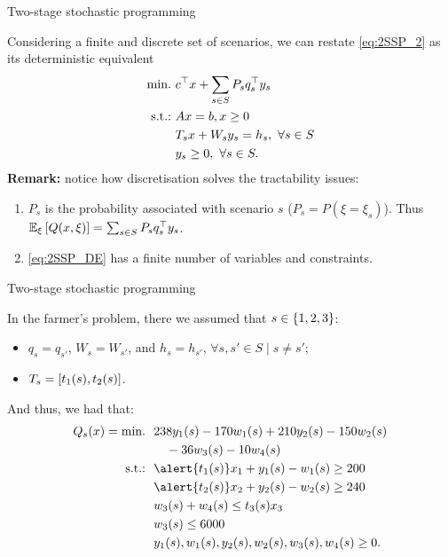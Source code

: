 \begin{frame}{Two-stage stochastic programming}

	Considering a finite and discrete set of scenarios, we can restate \eqref{eq:2SSP_2} as its \alert{deterministic equivalent}
	\begin{subequations} \label{eq:2SSP_DE}
	\begin{align}
		\mathop{\text{min.} \ }  & c^\top x + \sum_{s\in S} P_s q_s^\top y_s \\
		\mathop{\text{s.t.:} \ }	   & Ax = b, x \ge 0 \\
			   & T_sx + W_s y_s = h_s, \ \forall s \in S \\
			   & y_s \ge 0, \ \forall s \in S.
	\end{align}
	\end{subequations}
	\pause 
	{\bf Remark:} notice how discretisation solves the tractability issues:
	\vspace{-6pt}
	\begin{enumerate}
		\item $P_s$ is the probability associated with scenario $s$ ($P_s = P(\xi = \xi_s)$). Thus $\mathbb{E}_\xi\left[ Q(x, \xi) \right] = \sum_{s\in S} P_s q_s^\top y_s$.
		\item \eqref{eq:2SSP_DE} has a \alert{finite} number of variables and constraints.	
	\end{enumerate}


	
\end{frame}


\begin{frame}{Two-stage stochastic programming}
	
	In the farmer's problem, there we assumed that $s \in \left\{ 1,2,3 \right \}$:
		\vspace{-6pt}
		\begin{itemize}
			\item $q_s = q_{s'}$, $W_s = W_{s'}$, and $h_s = h_{s'}$, $\forall s, s' \in S \mid s \neq s'$;
			\item $T_s = \left[ t_1(s), t_2(s) \right]$.  	
		\end{itemize}
	
	\pause
	And thus, we had that:
	\begin{align*}
		Q_s(x) = \mini \ &238y_1(s) -170w_1(s) + 210y_2(s) - 150w_2(s) \\
		& \quad -36w_3(s) -10w_4(s) \\
		\st   \ & \alert{t_1(s)}x_1 + y_1(s) - w_1(s) \geq 200 \\
                & \alert{t_2(s)}x_2 + y_2(s) - w_2(s) \geq 240 \\
                & w_3(s) + w_4(s) \leq t_3(s)x_3 \\
                & w_3(s) \leq 6000 \\
                & y_1(s), w_1(s), y_2(s), w_2(s), w_3(s), w_4(s) \geq 0. 
	\end{align*}

	
\end{frame}


